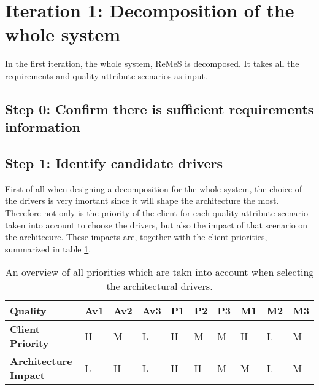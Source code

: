 \section{Iteration 1: Decomposition of the whole system}
\label{add:it1}

\npar In the first iteration, the whole system, ReMeS is decomposed. It takes
all the requirements and quality attribute scenarios as input.

\subsection{Step 0: Confirm there is sufficient requirements information} 


\subsection{Step 1: Identify candidate drivers}
\label{add:it1/drivers}


\npar First of all when designing a decomposition for the whole system, the
choice of the drivers is very imortant since it will shape the architecture the
most. Therefore not only is the priority of the client for each quality
attribute scenario taken into account to choose the drivers, but also the impact of
that scenario on the architecure. These impacts are, together with the client
priorities, summarized in table \ref{table:add/it1/priorities}.

\begin{table}
	\begin{center}
		\begin{tabular}{| l | l | l | l | l | l | l | l | l | l |}
		\hline
		\textbf{Quality}			&	Av1	&	Av2	&	Av3	&	P1	&	P2	&	P3	&	M1	&	M2	&	M3	\\
		\hline
		\textbf{Client Priority}	&	H	&	M	&	L	&	H	&	M	&	M	&	H	&	L	&	M	\\
		\hline
		\textbf{Architecture Impact}&	L	&	H	&	L	&	H	&	H	&	M	&	M	&	L	&	M	\\
		\hline
		\end{tabular}
		\caption{An overview of all priorities which are takn into account when
		selecting the architectural drivers.}
		\label{table:add/it1/priorities}
	\end{center}
\end{table}


